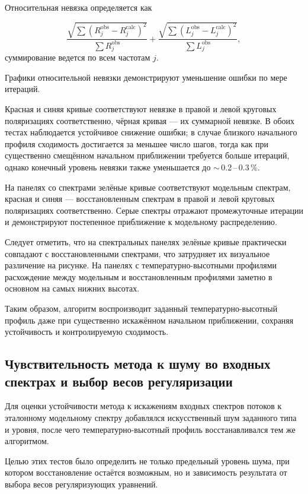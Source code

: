\documentclass[
 aps, pra,
 amsmath,amssymb,
 11pt,
 final,
tightenlines,
 twoside,
 twocolumn,
 nofloats,
nofootinbib,
 superscriptaddress,
showkeys,
showkeywords,
 ]
{revtex4-2}
\newcommand{\as}[1]{{\color{blue} #1}}
\begin{document}
\as{Относительная невязка определяется как
	
\begin{equation}
	\frac{\sqrt{\sum(R^{\mathrm{obs}}_j-R^{\mathrm{calc}}_j)^2}}{\sum R^{\mathrm{obs}}_j} + 
	\frac{\sqrt{\sum(L^{\mathrm{obs}}_j-L^{\mathrm{calc}}_j)^2}}{\sum L^{\mathrm{obs}}_j},
\end{equation}
суммирование ведется по всем частотам $j$.
	 
Графики  относительной невязки демонстрируют уменьшение ошибки по мере итераций.}
Красная и синяя кривые соответствуют невязке в правой и левой круговых поляризациях соответственно, чёрная кривая --- их суммарной невязке. В обоих тестах наблюдается устойчивое снижение ошибки; в случае близкого начального профиля сходимость достигается за меньшее число шагов, тогда как при существенно смещённом начальном приближении требуется больше итераций, однако конечный уровень невязки также уменьшается до
\as{$\sim$\,0.2\,--\,0.3\,\%.}

На панелях со спектрами зелёные кривые соответствуют модельным спектрам, красная и синяя --- восстановленным спектрам в правой и левой круговых поляризациях соответственно. Серые спектры отражают промежуточные итерации и демонстрируют постепенное приближение к модельному распределению.


\as{Следует отметить, что на спектральных панелях зелёные кривые практически
совпадают с восстановленными спектрами, что затрудняет их визуальное
различение на рисунке. На панелях с температурно-высотными профилями
расхождение между модельным и восстановленным профилями заметно в основном
на самых нижних высотах.}

Таким образом, алгоритм воспроизводит заданный температурно-высотный профиль даже при существенно искажённом начальном приближении, сохраняя устойчивость и контролируемую сходимость.

\subsection{Чувствительность метода к шуму во входных спектрах и выбор весов регуляризации}
\label{sec:noise_sensitivity}

Для оценки устойчивости метода к искажениям входных спектров \as{потоков}
к эталонному модельному спектру добавлялся искусственный шум
заданного типа и уровня, после чего температурно-высотный профиль
восстанавливался тем же алгоритмом.

\as{Целью этих тестов было определить не только предельный уровень шума, при котором восстановление остаётся возможным, но и зависимость результата от выбора весов регуляризующих уравнений.}
\end{document}
